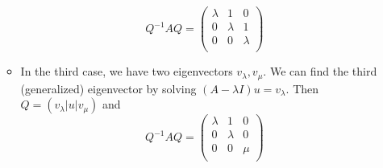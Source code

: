 \documentclass[../notes.tex]{subfiles}
\begin{document}
\begin{itemize}
\begin{itemize}
        \begin{equation*}
            Q^{-1}AQ =
            \begin{pmatrix}
                \lambda & 1 & 0\\
                0 & \lambda & 1\\
                0 & 0 & \lambda\\
            \end{pmatrix}
        \end{equation*}
        \item In the third case, we have two eigenvectors $v_\lambda,v_\mu$. We can find the third (generalized) eigenvector by solving $(A-\lambda I)u=v_\lambda$. Then $Q=(v_\lambda|u|v_\mu)$ and
        \begin{equation*}
            Q^{-1}AQ =
            \begin{pmatrix}
                \lambda & 1 & 0\\
                0 & \lambda & 0\\
                0 & 0 & \mu\\
            \end{pmatrix}
        \end{equation*}
    \end{itemize}
\end{itemize}
\end{document}
